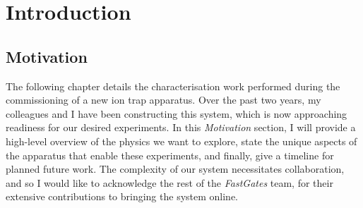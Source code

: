 \chapter{Introduction}
\minitoc

\section{Motivation}

    The following chapter details the characterisation work performed during the
    commissioning of a new ion trap apparatus. Over the past two years, my
    colleagues and I have been constructing this system, which is now
    approaching readiness for our desired experiments. In this
    \textit{Motivation} section, I will provide a high-level overview of the
    physics we want to explore, state the unique aspects of the apparatus that
    enable these experiments, and finally, give a timeline for planned future
    work. The complexity of our system necessitates collaboration, and so I
    would like to acknowledge the rest of the \emph{FastGates} team, for their
    extensive contributions to bringing the system online. \\

